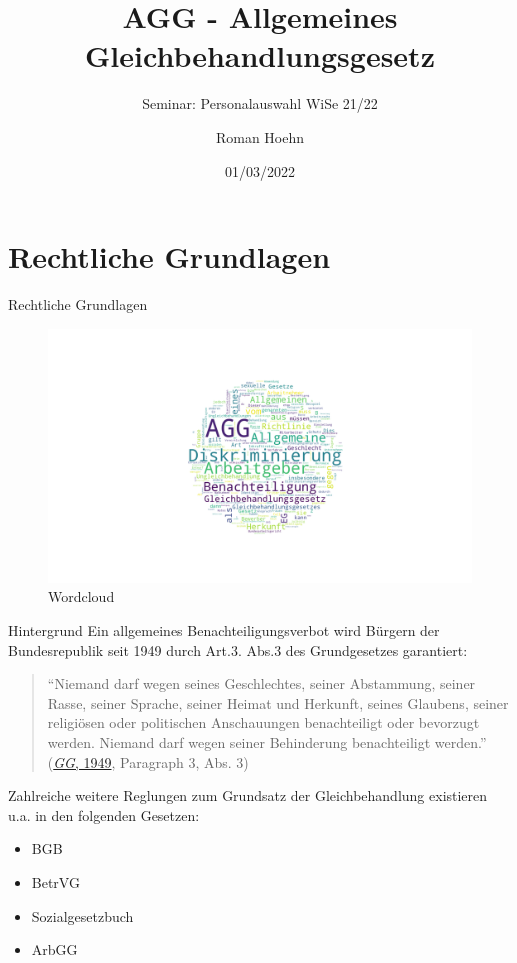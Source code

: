 \documentclass[
  10pt,
  ngerman,
  ignorenonframetext,
]{beamer}
\title{AGG - Allgemeines Gleichbehandlungsgesetz}
\subtitle{Seminar: Personalauswahl WiSe 21/22}
\author{Roman Hoehn}
\date{01/03/2022}
\providecommand{\tightlist}{%
  \setlength{\itemsep}{0pt}\setlength{\parskip}{0pt}}
\begin{document}
\frame{\titlepage}

\begin{frame}[allowframebreaks]
  \tableofcontents[hideallsubsections]
\end{frame}
\hypertarget{rechtliche-grundlagen}{%
\section{Rechtliche Grundlagen}\label{rechtliche-grundlagen}}

\begin{frame}{Rechtliche Grundlagen}
\begin{figure}
\centering
\includegraphics{plots/fig1.png}
\caption{Wordcloud}
\end{figure}
\end{frame}

\begin{frame}{Hintergrund}
\protect\hypertarget{hintergrund}{}
Ein allgemeines Benachteiligungsverbot wird Bürgern der Bundesrepublik
seit 1949 durch Art.3. Abs.3 des Grundgesetzes garantiert:

\begin{quote}
``Niemand darf wegen seines Geschlechtes, seiner Abstammung, seiner
Rasse, seiner Sprache, seiner Heimat und Herkunft, seines Glaubens,
seiner religiösen oder politischen Anschauungen benachteiligt oder
bevorzugt werden. Niemand darf wegen seiner Behinderung benachteiligt
werden.'' (\protect\hyperlink{ref-gg}{\emph{GG}, 1949}, Paragraph 3,
Abs. 3)
\end{quote}

Zahlreiche weitere Reglungen zum Grundsatz der Gleichbehandlung
existieren u.a. in den folgenden Gesetzen:

\begin{itemize}
\tightlist
\item
  BGB
\item
  BetrVG
\item
  Sozialgesetzbuch
\item
  ArbGG
\end{itemize}
\end{frame}
\end{document}
